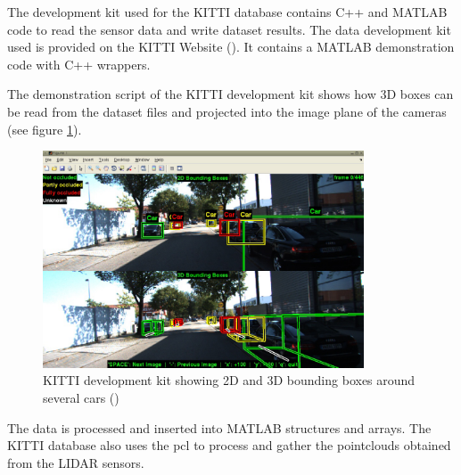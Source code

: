 The development kit used for the KITTI database contains C++ and MATLAB code to read the sensor data and write dataset results. The data development kit used is provided on the KITTI Website (\cite{KarlsruheInstituteofTechnology}). It contains a MATLAB demonstration code with C++ wrappers. 

The demonstration script of the KITTI development kit shows how 3D boxes can be read from the dataset files and projected into the image plane of the cameras (see figure \ref{fig:kittidk}). 

\begin{figure}[!hb]
	
	\centering
	\includegraphics[width=0.85\textwidth]{capstate/imgs/kittidk.png}
	
	\caption{KITTI development kit showing 2D and 3D bounding boxes around several cars (\cite{KarlsruheInstituteofTechnology})}
	\label{fig:kittidk}
	
\end{figure}

The data is processed and inserted into MATLAB structures and arrays. The KITTI database also uses the \gls{pcl} to process and gather the pointclouds obtained from the LIDAR sensors.


